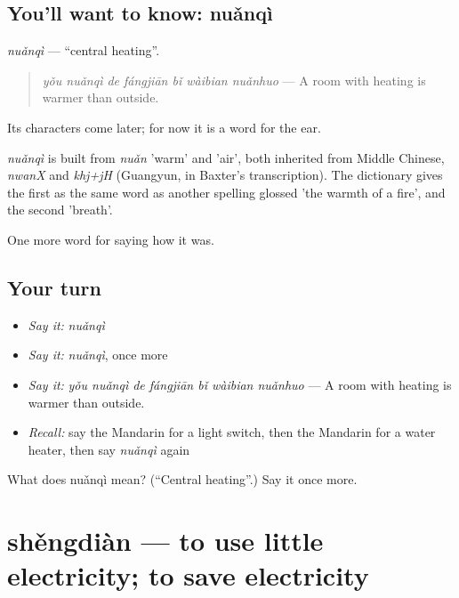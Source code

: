 \subsection*{You'll want to know: nuǎnqì}
\emph{nuǎnqì} — \textquotedblleft{}central heating\textquotedblright{}.

\begin{quote}
\emph{yǒu nuǎnqì de fángjiān bǐ wàibian nuǎnhuo} — A room with heating is warmer than outside.
\end{quote}

Its characters come later; for now it is a word for the ear.

\begin{cousinweb}
\emph{nuǎnqì} is built from \emph{nuǎn} 'warm' and  'air', both inherited from Middle Chinese, \emph{nwanX} and \emph{khj+jH} (Guangyun, in Baxter's transcription). The dictionary gives the first as the same word as another spelling glossed 'the warmth of a fire', and the second 'breath'.
\end{cousinweb}

\begin{grammarlens}[title={What you've built}]
One more word for saying how it was.
\end{grammarlens}

\subsection*{Your turn}
\begin{itemize}
\raggedright
  \item \emph{Say it:} \emph{nuǎnqì}
  \item \emph{Say it:} \emph{nuǎnqì}, once more
  \item \emph{Say it:} \emph{yǒu nuǎnqì de fángjiān bǐ wàibian nuǎnhuo} — A room with heating is warmer than outside.
  \item \emph{Recall:} say the Mandarin for a light switch, then the Mandarin for a water heater, then say \emph{nuǎnqì} again
\end{itemize}

\begin{tcolorbox}[breakable,colback=teal!4,colframe=teal!35!black,title={Before you move on}]
What does nuǎnqì mean? (\textquotedblleft{}Central heating\textquotedblright{}.) Say it once more.
\end{tcolorbox}
\section[shěngdiàn]{shěngdiàn — to use little electricity; to save electricity}

